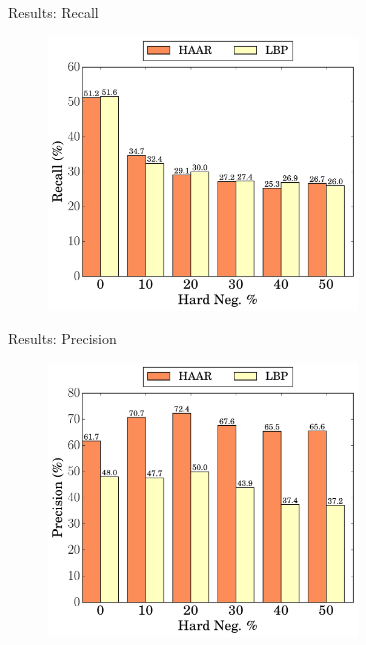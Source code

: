 \begin{frame}{Results: Recall}
	\begin{figure}
		\centering
		\includegraphics[width=0.73\textwidth]{results/results_fig_recall_6.pdf}%
	\end{figure}
\end{frame}
\begin{frame}{Results: Precision}
	\begin{figure}
		\centering
		\includegraphics[width=0.73\textwidth]{results/results_fig_precision_6.pdf}%
	\end{figure}
\end{frame}

